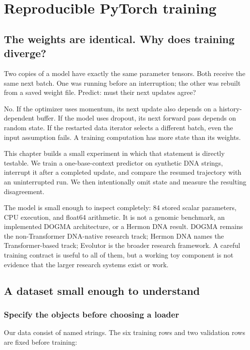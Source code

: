 \chapter{Reproducible PyTorch training}
\label{ch:training}

\section{The weights are identical. Why does training diverge?}

Two copies of a model have exactly the same parameter tensors. Both receive the same next batch. One was running before an interruption; the other was rebuilt from a saved weight file. Predict: must their next updates agree?

No. If the optimizer uses momentum, its next update also depends on a history-dependent buffer. If the model uses dropout, its next forward pass depends on random state. If the restarted data iterator selects a different batch, even the input assumption fails. A training computation has more state than its weights.

This chapter builds a small experiment in which that statement is directly testable. We train a one-base-context predictor on synthetic DNA strings, interrupt it after a completed update, and compare the resumed trajectory with an uninterrupted run. We then intentionally omit state and measure the resulting disagreement.

The model is small enough to inspect completely: 84 stored scalar parameters, CPU execution, and float64 arithmetic. It is not a genomic benchmark, an implemented DOGMA architecture, or a Hermon DNA result. DOGMA remains the non-Transformer DNA-native research track; Hermon DNA names the Transformer-based track; Evolutor is the broader research framework. A careful training contract is useful to all of them, but a working toy component is not evidence that the larger research systems exist or work.

\section{A dataset small enough to understand}

\subsection{Specify the objects before choosing a loader}

Our data consist of named strings. The six training rows and two validation rows are fixed before training:

